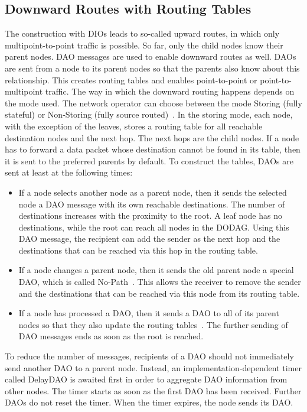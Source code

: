 \documentclass[english,version-2019-11]{uzl-thesis}
\begin{document}
\subsection{Downward Routes with Routing Tables}
The construction with DIOs leads to so-called upward routes,
in which only multipoint-to-point traffic is possible.
So far, only the child nodes know their parent nodes.
DAO messages are used to enable downward routes as well.
DAOs are sent from a node to its parent nodes so that
the parents also know about this relationship.
This creates routing tables and enables point-to-point
or point-to-multipoint traffic.
The way in which the downward routing happens depends on the mode used.
The network operator can choose between the mode Storing
(fully stateful) or Non-Storing (fully source routed)~\cite{rfc6550}.
In the storing mode, each node, with the exception
of the leaves, stores a routing table for all reachable
destination nodes and the next hop. The next hops are
the child nodes. If a node has to forward a data packet
whose destination cannot be found in its table, then
it is sent to the preferred parents by default.
To construct the tables, DAOs are sent at least at the following times:
\begin{itemize}
 \item If a node selects another node as a parent node,
 then it sends the selected node a DAO message with its own reachable destinations.
 The number of destinations increases with the proximity to the root.
 A leaf node has no destinations, while the root can reach all nodes in the DODAG.
 Using this DAO message, the recipient can add the sender as the next hop and the destinations
 that can be reached via this hop in the routing table.
 \item If a node changes a parent node, then it sends the old parent
 node a special DAO, which is called No-Path~\cite{rfc6550}. This allows the
 receiver to remove the sender and the destinations that can be
 reached via this node from its routing table.
 \item If a node has processed a DAO, then it sends a DAO to all of its parent
 nodes so that they also update the routing tables~\cite{rfc6550}. The further
 sending of DAO messages ends as soon as the root is reached.
\end{itemize}
To reduce the number of messages, recipients of a DAO should not immediately
send another DAO to a parent node. Instead, an implementation-dependent
timer called DelayDAO is awaited first in order to aggregate DAO
information from other nodes. The timer starts as soon as the first
DAO has been received. Further DAOs do not reset the timer.
When the timer expires, the node sends its DAO.~\cite{rfc6550}
\end{document}
